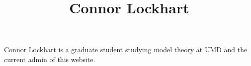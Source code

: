 \documentclass[a4paper]{article}
\title{Connor Lockhart}
\date{}
\begin{document}
\maketitle
\par{Connor Lockhart is a graduate student studying model theory at UMD and the current admin of this website.}
\printbibliography
\end{document}
